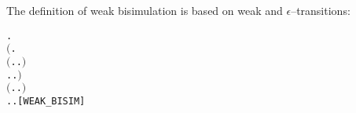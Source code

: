 The definition of weak bisimulation is based on weak and $\epsilon$--transitions:
\begin{alltt}
  \HOLSymConst{\HOLTokenDefEquality{}}
  \HOLSymConst{\HOLTokenForall{}} .
         \HOLSymConst{\HOLTokenImp{}}
      \ensuremath{(}\HOLSymConst{\HOLTokenForall{}}.
           \ensuremath{(}\HOLSymConst{\HOLTokenForall{}}.  \HOLTokenTransBegin{} \HOLTokenTransEnd {} \HOLSymConst{\HOLTokenImp{}} \HOLSymConst{\HOLTokenExists{}}.  \HOLTokenWeakTransBegin{} \HOLTokenWeakTransEnd {} \HOLSymConst{\HOLTokenConj{}}   \ensuremath{)} \HOLSymConst{\HOLTokenConj{}}
           \HOLSymConst{\HOLTokenForall{}}.  \HOLTokenTransBegin{} \HOLTokenTransEnd {} \HOLSymConst{\HOLTokenImp{}} \HOLSymConst{\HOLTokenExists{}}.  \HOLTokenWeakTransBegin{} \HOLTokenWeakTransEnd {} \HOLSymConst{\HOLTokenConj{}}   \ensuremath{)} \HOLSymConst{\HOLTokenConj{}}
      \ensuremath{(}\HOLSymConst{\HOLTokenForall{}}.  \HOLTokenTransBegin\HOLSymConst{\ensuremath{\tau}}\HOLTokenTransEnd {} \HOLSymConst{\HOLTokenImp{}} \HOLSymConst{\HOLTokenExists{}}.  \HOLSymConst{\HOLTokenEPS}  \HOLSymConst{\HOLTokenConj{}}   \ensuremath{)} \HOLSymConst{\HOLTokenConj{}}
      \HOLSymConst{\HOLTokenForall{}}.  \HOLTokenTransBegin\HOLSymConst{\ensuremath{\tau}}\HOLTokenTransEnd {} \HOLSymConst{\HOLTokenImp{}} \HOLSymConst{\HOLTokenExists{}}.  \HOLSymConst{\HOLTokenEPS}  \HOLSymConst{\HOLTokenConj{}}   \hfill{[WEAK_BISIM]}
\end{alltt}

